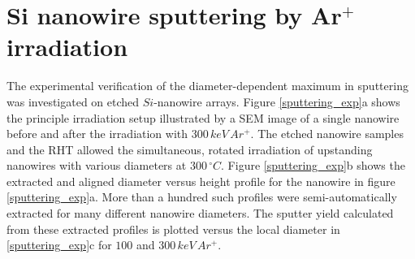



\section{Si nanowire sputtering by Ar$^+$ irradiation}
\label{sec:sisputtering}

The experimental verification of the diameter-dependent maximum in sputtering was investigated on etched $Si$-nanowire arrays. Figure \ref{sputtering_exp}a shows the principle irradiation setup illustrated by a SEM image of a single nanowire before and after the irradiation with $300\,keV\,Ar^+$. The etched nanowire samples and the RHT allowed the simultaneous, rotated irradiation of upstanding nanowires with various diameters at $300\,^\circ C$. Figure \ref{sputtering_exp}b shows the extracted and aligned diameter versus height profile for the nanowire in figure \ref{sputtering_exp}a. More than a hundred such profiles were semi-automatically extracted for many different nanowire diameters. The sputter yield calculated from these extracted profiles is plotted versus the local diameter in \ref{sputtering_exp}c for $100$ and $300\,keV\,Ar^+$.

